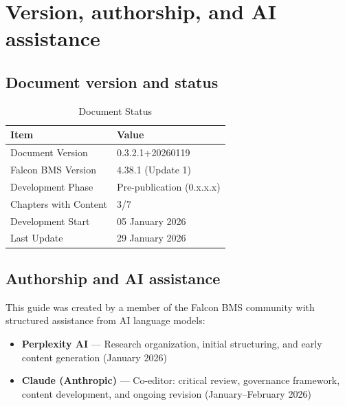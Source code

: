 \documentclass[11pt, a4paper, twoside]{report}
\newcommand{\docversion}{0.3.2.1}
\newcommand{\docbuild}{20260119}
\newcommand{\docstartdate}{05 January 2026}
\newcommand{\docenddate}{29 January 2026}
\newcommand{\chapterscompletedof}{3/7}
\newcommand{\fulldocversion}{\docversion+\docbuild}
\begin{document}
\section{Version, authorship, and AI assistance}
\label{sec:C1-S4}

\subsection{Document version and status}
\label{sec:C1-S4-S1}

\begin{table}[H]
	\centering
	\caption{Document Status}
	\label{tab:C1-doc-status}
	\small
	\renewcommand{\arraystretch}{1.25}
	\begin{tabular}{L{4.5cm} L{9.0cm}}
		\toprule
		\textbf{Item} & \textbf{Value} \\
		\midrule
		Document Version & \fulldocversion \\
		Falcon BMS Version & 4.38.1 (Update 1) \\
		Development Phase & Pre-publication (0.x.x.x) \\
		Chapters with Content & \chapterscompletedof \\
		Development Start & \docstartdate \\
		Last Update & \docenddate \\
		\bottomrule
	\end{tabular}
\end{table}

\subsection{Authorship and AI assistance}
\label{sec:C1-S4-S2}

This guide was created by a member of the Falcon BMS community with structured assistance from AI language models:

\begin{itemize}
	\item \textbf{Perplexity AI} --- Research organization, initial structuring, and early content generation (January 2026)
	\item \textbf{Claude (Anthropic)} --- Co-editor: critical review, governance framework, content development, and ongoing revision (January--February 2026)
\end{itemize}
\end{document}
